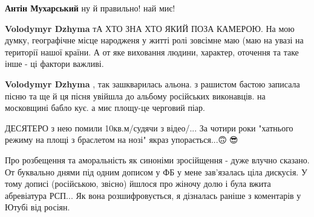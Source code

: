\begin{itemize}
\begin{itemize}
 
\textbf{Антін Мухарський} ну й правильно! най миє!

 
\textbf{Volodymyr Dzhyma} тА ХТО ЗНА ХТО ЯКИЙ ПОЗА КАМЕРОЮ. На мою думку, географічне місце народженя у житті ролі зовсімне маю (маю на увазі на території нашої країни. А от яке виховання людини, характер, оточення та таке інше - ці фактори важливі.

 
\textbf{Volodymyr Dzhyma} , так зашкварилась альона. з рашистом бастою записала пісню та ще й ця пісня увійшла до альбому російських виконавців. на московщині бабло кує.
а миє площу-це черговий піар.

 
ДЕСЯТЕРО з нею помили 10кв.м/судячи з відео/... За чотири роки "хатнього режиму
на площі з браслетом на нозі" якраз упорається...🙃🌺😎
\end{itemize}

 

Про розбещення та аморальність як синоніми зросійщення - дуже влучно сказано.
От буквально днями під одним дописом у ФБ у мене зав'язалась ціла дискусія. У
тому дописі (російською, звісно) йшлося про жіночу долю і була вжита
абревіатура РСП... Як вона розшифровується, я дізналась раніше з коментарів у
Ютубі від росіян.


\end{itemize}
